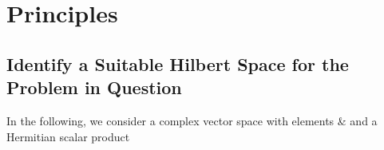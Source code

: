 \section{Principles}

\subsection{Identify a Suitable Hilbert Space for the Problem in Question}

In the following, we consider a complex vector space with elements \ket{\psi}& and a Hermitian scalar product